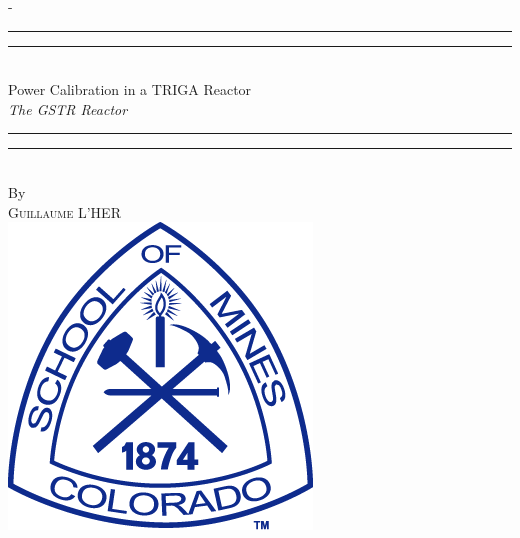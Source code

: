 %
%
% 
%
%
\begin{titlingpage}
\begin{SingleSpace}
\calccentering{\unitlength} 
\begin{adjustwidth*}{\unitlength}{-\unitlength}
\vspace*{13mm}
\begin{center}
\rule[0.5ex]{\linewidth}{2pt}\vspace*{-\baselineskip}\vspace*{3.2pt}
\rule[0.5ex]{\linewidth}{1pt}\\[\baselineskip]
{\HUGE Power Calibration in a TRIGA Reactor }\\[4mm]
{\Large \textit{The GSTR Reactor}}\\
\rule[0.5ex]{\linewidth}{1pt}\vspace*{-\baselineskip}\vspace{3.2pt}
\rule[0.5ex]{\linewidth}{2pt}\\
\vspace{6.5mm}
{\large By}\\
\vspace{6.5mm}
{\large\textsc{Guillaume L'HER}}\\
\vspace{11mm}
\includegraphics[scale=0.6]{logos/CSM}\\

\end{center}
\end{adjustwidth*}
\end{SingleSpace}
\end{titlingpage}
